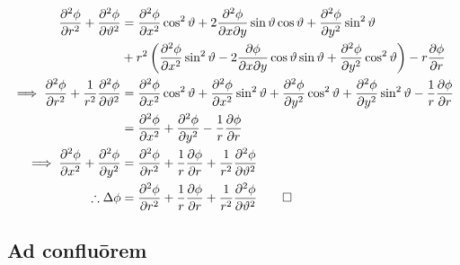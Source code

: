 \documentclass[a4paper,12pt]{article}
\renewcommand{\theta}{\vartheta}      		%
\newcommand{\partialder}[2]{\frac{\partial #1}{\partial #2}}        %
\begin{document}
\begin{align}
	\notag\frac{\partial^2\phi}{\partial r^2}+\frac{\partial^2\phi}{\partial\theta^2}&=\frac{\partial^2\phi}{\partial x^2}\cos^2\theta+2\frac{\partial^2\phi}{\partial x\partial y}\sin\theta\cos\theta+\frac{\partial^2\phi}{\partial y^2}\sin^2\theta\\
	\notag&+r^2\left(\frac{\partial^2\phi}{\partial x^2}\sin^2\theta-2\frac{\partial\phi}{\partial x\partial y}\cos\theta\sin\theta+\frac{\partial^2\phi}{\partial y^2}\cos^2\theta\right)-r\partialder{\phi}{r}\\
	\notag\implies\frac{\partial^2\phi}{\partial r^2}+\frac{1}{r^2}\frac{\partial^2\phi}{\partial\theta^2}&=\frac{\partial^2\phi}{\partial x^2}\cos^2\theta+\frac{\partial^2\phi}{\partial x^2}\sin^2\theta+\frac{\partial^2\phi}{\partial y^2}\cos^2\theta+\frac{\partial^2\phi}{\partial y^2}\sin^2\theta-\frac{1}{r}\partialder{\phi}{r}\\
	\notag&=\frac{\partial^2\phi}{\partial x^2}+\frac{\partial^2\phi}{\partial y^2}-\frac{1}{r}\partialder{\phi}{r}\\
	\notag\implies\frac{\partial^2\phi}{\partial x^2}+\frac{\partial^2\phi}{\partial y^2}&=\frac{\partial^2\phi}{\partial r^2}+\frac{1}{r}\partialder{\phi}{r}+\frac{1}{r^2}\frac{\partial^2\phi}{\partial\theta^2}\\
	\label{polap:final}\therefore\Delta\phi&=\frac{\partial^2\phi}{\partial r^2}+\frac{1}{r}\partialder{\phi}{r}+\frac{1}{r^2}\frac{\partial^2\phi}{\partial\theta^2}\qed
\end{align}

\subsection{Ad confluōrem}
\end{document}
